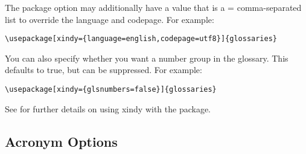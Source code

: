 \documentclass{nlctdoc}
\begin{document}
\begin{description}
The  package option may additionally have a value that
is a = comma-separated list to override the
language and codepage. For example:
\begin{verbatim}
\usepackage[xindy={language=english,codepage=utf8}]{glossaries}
\end{verbatim}
You can also specify whether you want a number group in the
glossary. This defaults to true, but can be suppressed. For example:
\begin{verbatim}
\usepackage[xindy={glsnumbers=false}]{glossaries}
\end{verbatim}
See  for further details on using \gls{xindy}
with the  package.

\end{description}

\subsection{Acronym Options}
\label{sec:pkgopts-acronym}
\end{document}
